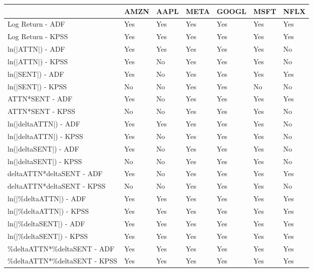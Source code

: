 \begin{tabular}{lllllll}
\toprule
{} & AMZN & AAPL & META & GOOGL & MSFT & NFLX \\
\midrule
Log Return - ADF             &  Yes &  Yes &  Yes &   Yes &  Yes &  Yes \\
Log Return - KPSS            &  Yes &  Yes &  Yes &   Yes &  Yes &  Yes \\
ln(|ATTN|) - ADF             &  Yes &  Yes &  Yes &   Yes &  Yes &   No \\
ln(|ATTN|) - KPSS            &  Yes &   No &  Yes &   Yes &  Yes &   No \\
ln(|SENT|) - ADF             &  Yes &   No &  Yes &   Yes &  Yes &  Yes \\
ln(|SENT|) - KPSS            &   No &   No &  Yes &   Yes &   No &   No \\
ATTN*SENT - ADF              &  Yes &   No &  Yes &   Yes &  Yes &  Yes \\
ATTN*SENT - KPSS             &   No &   No &  Yes &   Yes &  Yes &   No \\
ln(|deltaATTN|) - ADF        &  Yes &  Yes &  Yes &   Yes &  Yes &   No \\
ln(|deltaATTN|) - KPSS       &  Yes &   No &  Yes &   Yes &  Yes &   No \\
ln(|deltaSENT|) - ADF        &  Yes &   No &  Yes &   Yes &  Yes &   No \\
ln(|deltaSENT|) - KPSS       &   No &   No &  Yes &   Yes &  Yes &   No \\
deltaATTN*deltaSENT - ADF    &  Yes &   No &  Yes &   Yes &  Yes &  Yes \\
deltaATTN*deltaSENT - KPSS   &   No &   No &  Yes &   Yes &  Yes &   No \\
ln(|\%deltaATTN|) - ADF       &  Yes &  Yes &  Yes &   Yes &  Yes &  Yes \\
ln(|\%deltaATTN|) - KPSS      &  Yes &  Yes &  Yes &   Yes &  Yes &  Yes \\
ln(|\%deltaSENT|) - ADF       &  Yes &  Yes &  Yes &   Yes &  Yes &  Yes \\
ln(|\%deltaSENT|) - KPSS      &  Yes &  Yes &  Yes &   Yes &  Yes &  Yes \\
\%deltaATTN*\%deltaSENT - ADF  &  Yes &  Yes &  Yes &   Yes &  Yes &  Yes \\
\%deltaATTN*\%deltaSENT - KPSS &  Yes &  Yes &  Yes &   Yes &  Yes &  Yes \\
\bottomrule
\end{tabular}
